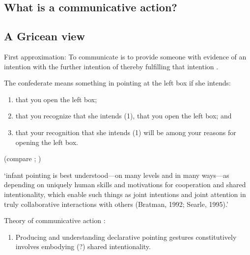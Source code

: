 \documentclass[12pt]{extarticle}
\begin{document}
\begin{multicols}{3}
 
 
\section{What is a communicative action?}
 
\subsection{A Gricean view}
 
First approximation: To communicate is to provide someone with evidence of an intention with the further intention of thereby fulfilling that intention
\citep[compare][chapter 14]{Grice:1989ha}.
 
The confederate means something in pointing at the left box if she intends:
 
\begin{enumerate}
 
\item
 
that you open the left box;
 
\item
 
that you recognize that she intends (1), that you open the left box; and
 
\item
 
that your recognition that she intends (1) will be among your reasons for opening the left box.
 
\end{enumerate}
 
(compare \citealp[p.\ 151]{Grice:1969pv}; \citealp[p.\ 544]{Neale:1992uw})
 
‘infant pointing is best understood---on many levels and in many ways---as depending on uniquely human skills and motivations for cooperation and shared intentionality, which enable such things as joint intentions and joint attention in truly collaborative interactions with others (Bratman, 1992; Searle, 1995).’
\citep[p.\ 706]{Tomasello:2007fi}
 
Theory of communicative action \citep[compare][]{Tomasello:2007fi}:
 
\begin{enumerate}
 
\item
 
Producing and understanding declarative pointing gestures constitutively involves embodying (?) shared intentionality.
 

\end{enumerate}
\end{multicols}
\end{document}
